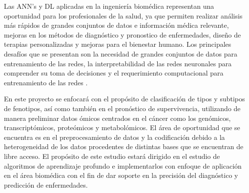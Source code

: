 Las ANN’s y DL aplicadas en la ingeniería biomédica representan una oportunidad para los profesionales de la salud, ya que permiten realizar análisis más rápidos de grandes conjuntos de datos e información médica relevante, mejoras en los métodos de diagnóstico y pronostico de enfermedades, diseño de terapias personalizadas y mejoras para el bienestar humano. Los principales desafíos que se presentan son la necesidad de grandes conjuntos de datos para entrenamiento de las redes, la interpretabilidad de las redes neuronales para comprender su toma de decisiones y el requerimiento computacional para entrenamiento de las redes \citep{sarmiento2020aplicaciones}.

En este proyecto se enfocará con el propósito de clasificación de tipos y subtipos de fenotipos, así como también en el pronóstico de supervivencia, utilizando de manera preliminar datos ómicos centrados en el cáncer como los genómicos, transcriptómicos, proteómicos y metabolómicos. El área de oportunidad que se encuentra es en el preprocesamiento de datos y la codificación debido a la heterogeneidad de los datos procedentes de distintas bases que se encuentran de libre acceso. El propósito de este estudio estará dirigido en el estudio de algoritmos de aprendizaje profundo e implementarlos con enfoque de aplicación en el área biomédica con el fin de dar soporte en la precisión del diagnóstico y predicción de enfermedades.

